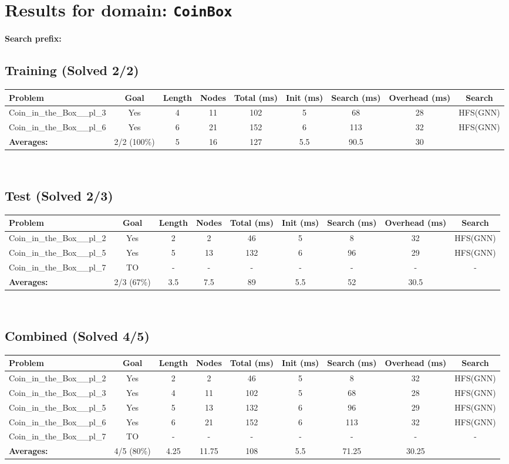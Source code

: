 \documentclass{article}
\begin{document}
\section*{Results for domain: \texttt{CoinBox}}
\textbf{Search prefix:} 
\\[0.5cm]
\subsection*{Training (Solved 2/2)}
\begin{tabular}{lcccccccc}
\toprule
Problem & Goal & Length & Nodes & Total (ms) & Init (ms) & Search (ms) & Overhead (ms) & Search \\
\midrule
Coin\_in\_the\_Box\_\_pl\_3 & Yes & 4 & 11 & 102 & 5 & 68 & 28 & HFS(GNN) \\
Coin\_in\_the\_Box\_\_pl\_6 & Yes & 6 & 21 & 152 & 6 & 113 & 32 & HFS(GNN) \\
\textbf{Averages:} & 2/2 (100\%) & 5 & 16 & 127 & 5.5 & 90.5 & 30 & \\
\bottomrule
\end{tabular}
\\[0.7cm]
\subsection*{Test (Solved 2/3)}
\begin{tabular}{lcccccccc}
\toprule
Problem & Goal & Length & Nodes & Total (ms) & Init (ms) & Search (ms) & Overhead (ms) & Search \\
\midrule
Coin\_in\_the\_Box\_\_pl\_2 & Yes & 2 & 2 & 46 & 5 & 8 & 32 & HFS(GNN) \\
Coin\_in\_the\_Box\_\_pl\_5 & Yes & 5 & 13 & 132 & 6 & 96 & 29 & HFS(GNN) \\
Coin\_in\_the\_Box\_\_pl\_7 & TO & - & - & - & - & - & - & - \\
\textbf{Averages:} & 2/3 (67\%) & 3.5 & 7.5 & 89 & 5.5 & 52 & 30.5 & \\
\bottomrule
\end{tabular}
\\[0.7cm]
\subsection*{Combined (Solved 4/5)}
\begin{tabular}{lcccccccc}
\toprule
Problem & Goal & Length & Nodes & Total (ms) & Init (ms) & Search (ms) & Overhead (ms) & Search \\
\midrule
Coin\_in\_the\_Box\_\_pl\_2 & Yes & 2 & 2 & 46 & 5 & 8 & 32 & HFS(GNN) \\
Coin\_in\_the\_Box\_\_pl\_3 & Yes & 4 & 11 & 102 & 5 & 68 & 28 & HFS(GNN) \\
Coin\_in\_the\_Box\_\_pl\_5 & Yes & 5 & 13 & 132 & 6 & 96 & 29 & HFS(GNN) \\
Coin\_in\_the\_Box\_\_pl\_6 & Yes & 6 & 21 & 152 & 6 & 113 & 32 & HFS(GNN) \\
Coin\_in\_the\_Box\_\_pl\_7 & TO & - & - & - & - & - & - & - \\
\textbf{Averages:} & 4/5 (80\%) & 4.25 & 11.75 & 108 & 5.5 & 71.25 & 30.25 & \\
\bottomrule
\end{tabular}
\\[0.7cm]
\end{document}
